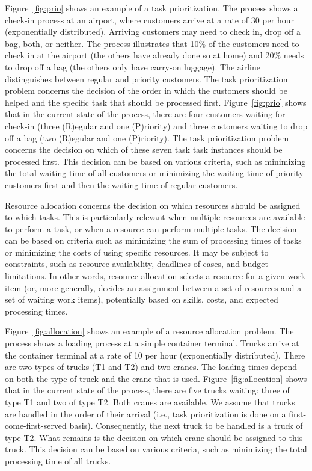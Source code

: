 \documentclass[runningheads]{llncs}
\begin{document}
Figure~\ref{fig:prio} shows an example of a task prioritization. The process shows a check-in process at an airport, where customers arrive at a rate of 30 per hour (exponentially distributed). Arriving customers may need to check in, drop off a bag, both, or neither. The process illustrates that 10\% of the customers need to check in at the airport (the others have already done so at home) and 20\% needs to drop off a bag (the others only have carry-on luggage). The airline distinguishes between regular and priority customers. The task prioritization problem concerns the decision of the order in which the customers should be helped and the specific task that should be processed first. Figure~\ref{fig:prio} shows that in the current state of the process, there are four customers waiting for check-in (three (R)egular and one (P)riority) and three customers waiting to drop off a bag (two (R)egular and one (P)riority). The task prioritization problem concerns the decision on which of these seven task task instances should be processed first. This decision can be based on various criteria, such as minimizing the total waiting time of all customers or minimizing the waiting time of priority customers first and then the waiting time of regular customers.

Resource allocation concerns the decision on which resources should be assigned to which tasks. This is particularly relevant when multiple resources are available to perform a task, or when a resource can perform multiple tasks. The decision can be based on criteria such as minimizing the sum of processing times of tasks or minimizing the costs of using specific resources. It may be subject to constraints, such as resource availability, deadlines of cases, and budget limitations.
In other words, resource allocation selects a resource for a given work item (or, more generally, decides an assignment between a set of resources and a set of waiting work items), potentially based on skills, costs, and expected processing times.

Figure~\ref{fig:allocation} shows an example of a resource allocation problem. The process shows a loading process at a simple container terminal. Trucks arrive at the container terminal at a rate of 10 per hour (exponentially distributed). There are two types of trucks (T1 and T2) and two cranes. The loading times depend on both the type of truck and the crane that is used. Figure~\ref{fig:allocation} shows that in the current state of the process, there are five trucks waiting: three of type T1 and two of type T2. Both cranes are available. We assume that trucks are handled in the order of their arrival (i.e., task prioritization is done on a first-come-first-served basis). Consequently, the next truck to be handled is a truck of type T2. What remains is the decision on which crane should be assigned to this truck. This decision can be based on various criteria, such as minimizing the total processing time of all trucks.
\end{document}

